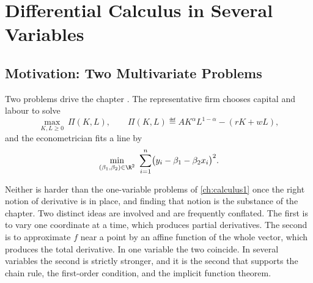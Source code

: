 
\chapter{Differential Calculus in Several Variables}
\label{ch:calculusn}

\section{Motivation: Two Multivariate Problems}\label{sec:cn-motivation}

Two problems drive the chapter \autocite[slide 43]{fukuda2026calculus}. The
representative firm chooses capital and labour to solve
\begin{equation}\label{eq:rep-firm}
	\max_{K,L\geq0}\ \Pi(K,L),\qquad
	\Pi(K,L)\eqdef AK^{\alpha}L^{1-\alpha}-(rK+wL),
\end{equation}
and the econometrician fits a line by
\begin{equation}\label{eq:ols-problem}
	\min_{(\beta_1,\beta_2)\in\R^2}\ \sum_{i=1}^{n}\bigl(y_i-\beta_1-\beta_2x_i\bigr)^2 .
\end{equation}

Neither is harder than the one-variable problems of \autoref{ch:calculus1} once
the right notion of derivative is in place, and finding that notion is the
substance of the chapter. Two distinct ideas are involved and are frequently
conflated. The first is to vary one coordinate at a time, which produces partial
derivatives. The second is to approximate $f$ near a point by an affine function
of the whole vector, which produces the total derivative. In one variable the two
coincide. In several variables the second is strictly stronger, and it is the
second that supports the chain rule, the first-order condition, and the implicit
function theorem.

